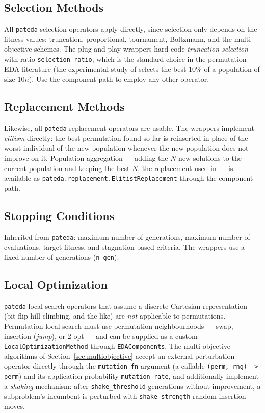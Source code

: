 \documentclass[a4paper,11pt]{article}
\begin{document}
\subsection{Selection Methods}

All \texttt{pateda} selection operators apply directly, since selection only
depends on the fitness values: truncation, proportional, tournament, Boltzmann,
and the multi-objective schemes.  The plug-and-play wrappers hard-code
\emph{truncation selection} with ratio \texttt{selection\_ratio}, which is the
standard choice in the permutation EDA literature (the experimental study of
\cite{Irurozki_et_al:2018} selects the best $10\%$ of a population of size
$10n$).  Use the component path to employ any other operator.

\subsection{Replacement Methods}

Likewise, all \texttt{pateda} replacement operators are usable.  The wrappers
implement \emph{elitism} directly: the best permutation found so far is
reinserted in place of the worst individual of the new population whenever the
new population does not improve on it.  Population aggregation --- adding the
$N$ new solutions to the current population and keeping the best $N$, the
replacement used in \cite{Irurozki_et_al:2018} --- is available as
\texttt{pateda.replacement.ElitistReplacement} through the component path.

\subsection{Stopping Conditions}

Inherited from \texttt{pateda}: maximum number of generations, maximum number of
evaluations, target fitness, and stagnation-based criteria.  The wrappers use a
fixed number of generations (\texttt{n\_gen}).

\subsection{Local Optimization}

\texttt{pateda} local search operators that assume a discrete Cartesian
representation (bit-flip hill climbing, and the like) are \emph{not} applicable
to permutations.  Permutation local search must use permutation neighbourhoods
--- swap, insertion (\emph{jump}), or 2-opt --- and can be supplied as a custom
\texttt{LocalOptimizationMethod} through \texttt{EDAComponents}.  The
multi-objective algorithms of Section~\ref{sec:multiobjective} accept an external
perturbation operator directly through the \texttt{mutation\_fn} argument
(a callable \texttt{(perm, rng) -> perm}) and its application probability
\texttt{mutation\_rate}, and additionally implement a \emph{shaking} mechanism:
after \texttt{shake\_threshold} generations without improvement, a subproblem's
incumbent is perturbed with \texttt{shake\_strength} random insertion moves.
\end{document}
